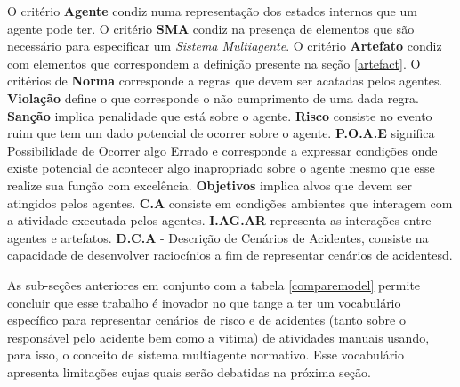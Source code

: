 O critério \textbf{Agente} condiz numa representação dos estados internos que um agente pode ter. O critério \textbf{SMA} condiz na presença de elementos que são necessário para
especificar um \textit{Sistema Multiagente}. O critério \textbf{Artefato} condiz com elementos que correspondem a definição presente na seção \ref{artefact}. O critérios de 
\textbf{Norma} corresponde a regras que devem ser acatadas pelos agentes. \textbf{Violação} define o que corresponde o não cumprimento de uma dada regra. \textbf{Sanção} implica 
penalidade que está sobre o agente. \textbf{Risco} consiste no evento ruim que tem um dado potencial de ocorrer sobre o agente. \textbf{P.O.A.E} significa Possibilidade de Ocorrer 
algo Errado e corresponde a expressar condições onde existe potencial de acontecer algo inapropriado sobre o agente mesmo que esse realize sua função com excelência.  \textbf{Objetivos} 
implica alvos que devem ser atingidos pelos agentes. \textbf{C.A} consiste em condições ambientes que interagem com a atividade executada pelos agentes. \textbf{I.AG.AR} representa 
as interações entre agentes e artefatos. \textbf{D.C.A} - Descrição de Cenários de Acidentes, consiste na capacidade de desenvolver raciocínios a fim de representar cenários de acidentesd.

As sub-seções anteriores em conjunto com a tabela \ref{comparemodel} permite concluir que esse trabalho é inovador no que tange a ter um vocabulário específico para representar cenários 
de risco e de acidentes (tanto sobre o responsável pelo acidente bem como a vitima) de atividades manuais usando, para isso, o conceito de sistema multiagente normativo. Esse 
vocabulário apresenta limitações cujas quais serão debatidas na próxima seção. 